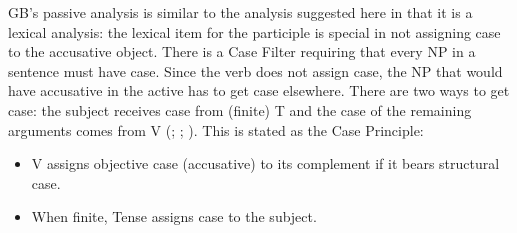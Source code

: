 GB's passive analysis is similar to the analysis suggested here in that it is a lexical analysis:
the lexical item for the participle is special in not assigning case to the accusative object. There
is a Case Filter requiring that every NP in a sentence must have case. Since the verb does not
assign case, the NP that would have accusative in the active has to get case elsewhere. There are two
ways to get case: the subject receives case from (finite) T and
the case of the remaining arguments comes from V (\citealp[]{Chomsky81a}; \citealp[]{Haider84b}; \citealp[--73]{FF87a}). This is stated as the Case Principle:
\begin{principle-break}\label{Kasusprinzip-GB}
\begin{itemize}
\item V assigns objective case (accusative) to its complement if it bears structural case.
\item When finite, Tense assigns case to the subject.
\end{itemize}
\end{principle-break}


